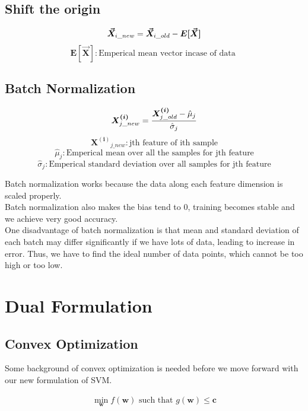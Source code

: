 \documentclass[12pt]{article}
\begin{document}
    \subsection{Shift the origin}
    \[
        \boldsymbol{\Vec{X}}_{i\_new} = \boldsymbol{\Vec{X}}_{i\_old} - \boldsymbol{E[\Vec{X}]}\\
    \]
    \[\boldsymbol{E[\Vec{X}]} : \text{Emperical mean vector incase of data }\]

    \subsection{Batch Normalization}
    \[
        \boldsymbol{X^{(i)}}_{j\_new} = \frac{\boldsymbol{X^{(i)}}_{j\_old} - \hat{\mu}_j}{\hat{\sigma}_j}\\
    \]
    \[\boldsymbol{X^{(i)}}_{j\_new} : \text{jth feature of ith sample}\]
    \[{\hat{\mu}_j} : \text{Emperical mean over all the samples for jth feature}\]
    \[{\hat{\sigma}_j} : \text{Emperical standard deviation over all samples for jth feature}\]

    \noindent Batch normalization works because the data along each feature dimension is scaled properly. \\
    Batch normalization also makes the bias tend to 0, training becomes stable and we achieve very good accuracy. \\
    One disadvantage of batch normalization is that mean and standard deviation of each batch may differ significantly if we have lots of data, leading to increase in error. Thus, we have to find the ideal number of data points, which cannot be too high or too low.

\section{Dual Formulation}

\subsection{Convex Optimization}
Some background of convex optimization is needed before we move forward with our new formulation of SVM.

\begin{gather}
    \min_{\boldsymbol{w}} f(\boldsymbol{w}) \textrm{ such that } g(\boldsymbol{w}) \leq \boldsymbol{c} \label{eq:1} 
\end{gather}
\end{document}
